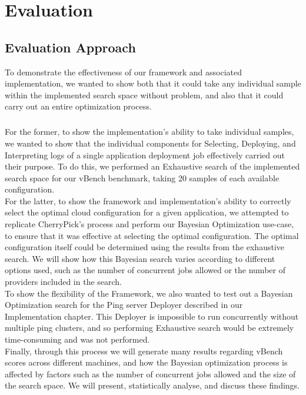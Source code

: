 \documentclass{report}
\begin{document}
\chapter{Evaluation}
\section{Evaluation Approach}
To demonstrate the effectiveness of our framework and associated implementation, we wanted to show both that it could take any individual sample within the implemented search space without problem, and also that it could carry out an entire optimization process. 
\paragraph{}
For the former, to show the implementation's ability to take individual samples, we wanted to show that the individual components for Selecting, Deploying, and Interpreting logs of a single application deployment job effectively carried out their purpose. To do this, we performed an Exhaustive search of the implemented search space for our vBench benchmark, taking 20 samples of each available configuration.\\
For the latter, to show the framework and implementation's ability to correctly select the optimal cloud configuration for a given application, we attempted to replicate CherryPick's\cite{Alipourfard2017} process and perform our Bayesian Optimization use-case, to ensure that it was effective at selecting the optimal configuration. The optimal configuration itself could be determined using the results from the exhaustive search. We will show how this Bayesian search varies according to different options used, such as the number of concurrent jobs allowed or the number of providers included in the search.\\
To show the flexibility of the Framework, we also wanted to test out a Bayesian Optimization search for the Ping server Deployer described in our Implementation chapter. This Deployer is impossible to run concurrently without multiple ping clusters, and so performing Exhaustive search would be extremely time-consuming and was not performed. \\
Finally, through this process we will generate many results regarding vBench scores across different machines, and how the Bayesian optimization process is affected by factors such as the number of concurrent jobs allowed and the size of the search space. We will present, statistically analyse, and discuss these findings.
\end{document}
